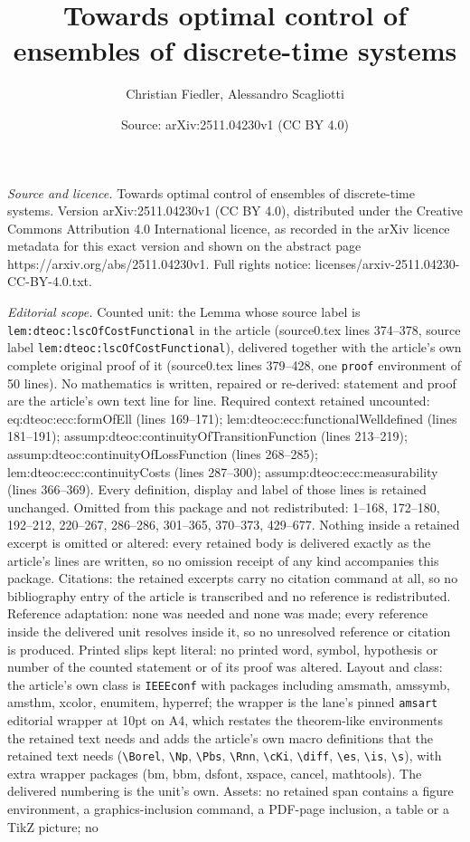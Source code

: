 \documentclass[10pt,a4paper]{amsart}
\title[Towards optimal control of ensembles of discrete-time system]{Towards optimal control of ensembles of discrete-time systems}
\author{Christian Fiedler, Alessandro Scagliotti}
\date{Source: arXiv:2511.04230v1 (CC BY 4.0)}
\begin{document}
\maketitle

\noindent\emph{Source and licence.} Towards optimal control of ensembles of discrete-time systems. Version arXiv:2511.04230v1 (CC BY 4.0), distributed under the Creative Commons Attribution 4.0 International licence, as recorded in the arXiv licence metadata for this exact version and shown on the abstract page https://arxiv.org/abs/2511.04230v1. Full rights notice: licenses/arxiv-2511.04230-CC-BY-4.0.txt.\par\smallskip

\noindent\textit{Editorial scope.} Counted unit: the Lemma whose source label is \texttt{lem:dteoc:lscOfCostFunctional} in the article (source0.tex lines 374--378, source label \texttt{lem:dteoc:lscOfCostFunctional}), delivered together with the article's own complete original proof of it (source0.tex lines 379--428, one \texttt{proof} environment of 50 lines). No mathematics is written, repaired or re-derived: statement and proof are the article's own text line for line. Required context retained uncounted: eq:dteoc:ecc:formOfEll (lines 169--171); lem:dteoc:ecc:functionalWelldefined (lines 181--191); assump:dteoc:continuityOfTransitionFunction (lines 213--219); assump:dteoc:continuityOfLossFunction (lines 268--285); lem:dteoc:ecc:continuityCosts (lines 287--300); assump:dteoc:ecc:measurability (lines 366--369). Every definition, display and label of those lines is retained unchanged. Omitted from this package and not redistributed: 1--168, 172--180, 192--212, 220--267, 286--286, 301--365, 370--373, 429--677. Nothing inside a retained excerpt is omitted or altered: every retained body is delivered exactly as the article's lines are written, so no omission receipt of any kind accompanies this package. Citations: the retained excerpts carry no citation command at all, so no bibliography entry of the article is transcribed and no reference is redistributed. Reference adaptation: none was needed and none was made; every reference inside the delivered unit resolves inside it, so no unresolved reference or citation is produced. Printed slips kept literal: no printed word, symbol, hypothesis or number of the counted statement or of its proof was altered. Layout and class: the article's own class is \texttt{IEEEconf} with packages including amsmath, amssymb, amsthm, xcolor, enumitem, hyperref; the wrapper is the lane's pinned \texttt{amsart} editorial wrapper at 10pt on A4, which restates the theorem-like environments the retained text needs and adds the article's own macro definitions that the retained text needs (\texttt{\textbackslash Borel}, \texttt{\textbackslash Np}, \texttt{\textbackslash Pbs}, \texttt{\textbackslash Rnn}, \texttt{\textbackslash cKi}, \texttt{\textbackslash diff}, \texttt{\textbackslash es}, \texttt{\textbackslash is}, \texttt{\textbackslash s}), with extra wrapper packages (bm, bbm, dsfont, xspace, cancel, mathtools). The delivered numbering is the unit's own. Assets: no retained span contains a figure environment, a graphics-inclusion command, a PDF-page inclusion, a table or a TikZ picture; no 
\end{document}
